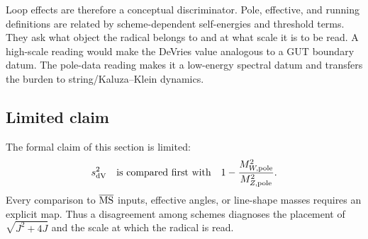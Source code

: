 Loop effects are therefore a conceptual discriminator.  Pole, effective, and running definitions are related by scheme-dependent self-energies and threshold terms.  They ask what object the radical belongs to and at what scale it is to be read.  A high-scale reading would make the DeVries value analogous to a GUT boundary datum.  The pole-data reading makes it a low-energy spectral datum and transfers the burden to string/Kaluza--Klein dynamics.

\subsection{Limited claim}

The formal claim of this section is limited:
\begin{equation}
  s^2_{\rm dV}
  \quad\text{is compared first with}\quad
  1-\frac{M_{W,\rm pole}^2}{M_{Z,\rm pole}^2}.
  \label{eq:pole-claim-limited}
\end{equation}
Every comparison to \(\overline{\mathrm{MS}}\) inputs, effective angles, or line-shape masses requires an explicit map.  Thus a disagreement among schemes diagnoses the placement of \(\sqrt{J^2+4J}\) and the scale at which the radical is read.
